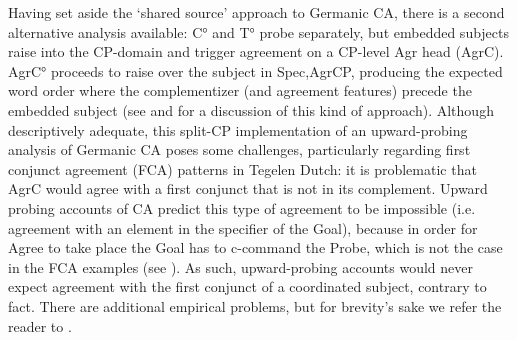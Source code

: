 Having set aside the `shared source' approach to Germanic CA, there is a second alternative analysis available: C° and T° probe separately, but embedded subjects raise into the CP-domain and trigger agreement on a CP-level Agr head (AgrC). AgrC° proceeds to raise over the subject in Spec,AgrCP, producing the expected word order where the complementizer (and agreement features) precede the embedded subject (see \citealt{Shlonsky:1994} and \citealt{Zwart:1993} for a discussion of this kind of approach). Although descriptively adequate, this split-CP implementation of an upward-probing analysis of Germanic CA poses some challenges, particularly regarding first conjunct agreement (FCA) patterns in Tegelen Dutch: it is problematic that AgrC would agree with a first conjunct that is not in its complement. Upward probing accounts of CA predict this type of agreement to be impossible (i.e. agreement with an element in the specifier of the Goal), because in order for Agree to take place the Goal has to c-command the Probe, which is not the case in the FCA examples (see \citealt{Baker:2008,Zeijlstra:2012,Wurmbrand:2011}). As such, upward-probing accounts would never expect agreement with the first conjunct of a coordinated subject, contrary to fact. There are additional empirical problems, but for brevity's sake we refer the reader to \citet{vanKoppen:2005,vanKoppen:2017}.



